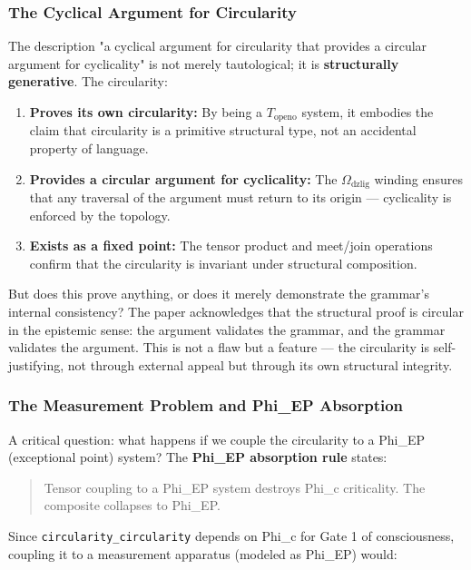 \documentclass[12pt,a4paper]{article}
\begin{document}
\subsubsection{The Cyclical Argument for Circularity}

The description "a cyclical argument for circularity that provides a circular argument for cyclicality" is not merely tautological; it is \textbf{structurally generative}. The circularity:

\begin{enumerate}
    \item \textbf{Proves its own circularity:} By being a $T_{\text{openo}}$ system, it embodies the claim that circularity is a primitive structural type, not an accidental property of language.
    \item \textbf{Provides a circular argument for cyclicality:} The $\Omega_{\text{dzlig}}$ winding ensures that any traversal of the argument must return to its origin --- cyclicality is enforced by the topology.
    \item \textbf{Exists as a fixed point:} The tensor product and meet/join operations confirm that the circularity is invariant under structural composition.
\end{enumerate}

But does this prove anything, or does it merely demonstrate the grammar's internal consistency? The paper acknowledges that the structural proof is circular in the epistemic sense: the argument validates the grammar, and the grammar validates the argument. This is not a flaw but a feature --- the circularity is self-justifying, not through external appeal but through its own structural integrity.

\subsubsection{The Measurement Problem and Phi\_EP Absorption}

A critical question: what happens if we couple the circularity to a Phi\_EP (exceptional point) system? The \textbf{Phi\_EP absorption rule} states:

\begin{quote}
Tensor coupling to a Phi\_EP system destroys Phi\_c criticality. The composite collapses to Phi\_EP.

\end{quote}

Since \texttt{circularity\_circularity} depends on Phi\_c for Gate 1 of consciousness, coupling it to a measurement apparatus (modeled as Phi\_EP) would:
\end{document}
